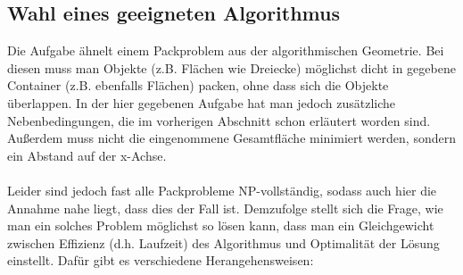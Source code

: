 \documentclass[a4paper, notitlepage, 12pt]{scrartcl}
\begin{document}
 \subsection{Wahl eines geeigneten Algorithmus}
 Die Aufgabe ähnelt einem Packproblem aus der algorithmischen Geometrie. Bei diesen muss man Objekte (z.B. Flächen wie Dreiecke) möglichst dicht in gegebene Container (z.B. ebenfalls Flächen) packen, ohne dass sich die Objekte überlappen.\cite{Src:pack} In der hier gegebenen Aufgabe hat man jedoch zusätzliche Nebenbedingungen, die im vorherigen Abschnitt schon erläutert worden sind. Außerdem muss nicht die eingenommene Gesamtfläche minimiert werden, sondern ein Abstand auf der x-Achse. \\ \\
 Leider sind jedoch fast alle Packprobleme NP-vollständig, sodass auch hier die Annahme nahe liegt, dass dies der Fall ist. Demzufolge stellt sich die Frage, wie man ein solches Problem möglichst so lösen kann, dass man ein Gleichgewicht zwischen Effizienz (d.h. Laufzeit) des Algorithmus und Optimalität der Lösung einstellt. Dafür gibt es verschiedene Herangehensweisen:
\end{document}
